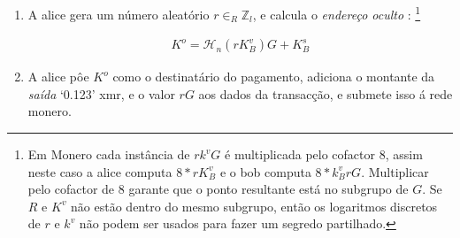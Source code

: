 \begin{enumerate}
	\item A alice gera um número aleatório $r \in_R \mathbb{Z}_l$, e calcula o {\em endereço oculto} :
\footnote{Em Monero cada instância de $r k^v G$ é multiplicada pelo cofactor 8, assim neste caso a alice computa $8*r K^v_B$ e o bob computa $8*k^v_B r G$. Multiplicar pelo cofactor de 8 garante que o ponto resultante está no subgrupo de $G$. Se $R$ e $K^v$ não estão dentro do mesmo subgrupo, então os logaritmos discretos de $r$ e $k^v$ não podem ser usados para fazer um segredo partilhado.} 

\vspace{.175cm}
\begin{align*}
K^o  = \mathcal{H}_n(r K_B^v)G + K_B^s
\end{align*}

	\item A alice pôe $K^o$ como o destinatário do pagamento, adiciona o montante da {\em saída} `0.123' xmr, e o valor $r G$ aos dados da transacção, e submete isso á rede monero.


\end{enumerate}
